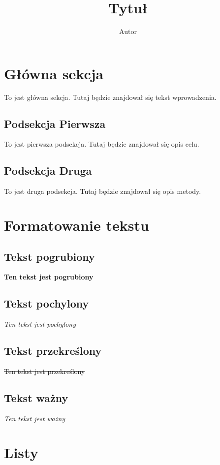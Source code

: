 \documentclass{article}
\title{Tytuł}
\begin{document}
\author{Autor}
\maketitle

\section{Główna sekcja}
To jest główna sekcja. Tutaj będzie znajdował się tekst wprowadzenia.

\subsection{Podsekcja Pierwsza}
To jest pierwsza podsekcja. Tutaj będzie znajdował się opis celu.

\subsection{Podsekcja Druga}
To jest druga podsekcja. Tutaj będzie znajdował się opis metody.

\section{Formatowanie tekstu}

\subsection{Tekst pogrubiony}
\textbf{Ten tekst jest pogrubiony}

\subsection{Tekst pochylony}
\textit{Ten tekst jest pochylony}

\subsection{Tekst przekreślony}
\sout{Ten tekst jest przekreślony}

\subsection{Tekst ważny}
\emph{Ten tekst jest ważny}

\section{Listy}
\end{document}
